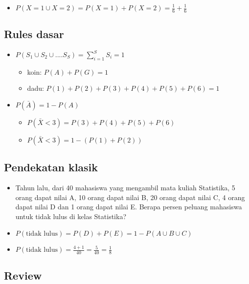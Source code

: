 \documentclass[
  letterpaper,
  DIV=11,
  numbers=noendperiod]{scrartcl}
\providecommand{\tightlist}{%
  \setlength{\itemsep}{0pt}\setlength{\parskip}{0pt}}\usepackage{longtable,booktabs,array}
\begin{document}
\begin{itemize}
\tightlist
\item
  \(P(X=1 \cup X=2)=P(X=1)+P(X=2)=\frac{1}{6}+\frac{1}{6}\)
\end{itemize}

\subsection{Rules dasar}\label{rules-dasar-1}

\begin{itemize}
\item
  \(P(S_1 \cup S_2 \cup .... S_S)=\sum_{i=1}^S S_i=1\)

  \begin{itemize}
  \item
    koin: \(P(A)+P(G)=1\)
  \item
    dadu: \(P(1)+P(2)+P(3)+P(4)+P(5)+P(6)=1\)
  \end{itemize}
\item
  \(P(\bar{A})=1-P(A)\)

  \begin{itemize}
  \item
    \(P(\bar{X}<3)=P(3)+P(4)+P(5)+P(6)\)
  \item
    \(P(\bar{X}<3)=1-\left(P(1)+P(2) \right)\)
  \end{itemize}
\end{itemize}

\subsection{Pendekatan klasik}\label{pendekatan-klasik}

\begin{itemize}
\item
  Tahun lalu, dari 40 mahasiswa yang mengambil mata kuliah Statistika, 5
  orang dapat nilai A, 10 orang dapat nilai B, 20 orang dapat nilai C, 4
  orang dapat nilai D dan 1 orang dapat nilai E. Berapa persen peluang
  mahasiswa untuk tidak lulus di kelas Statistika?
\item
  \(P(\text{tidak lulus})=P(D)+P(E)=1-P(A \cup B \cup C)\)
\item
  \(P(\text{tidak lulus})=\frac{4+1}{40}=\frac{5}{40}=\frac{1}{8}\)
\end{itemize}

\subsection{Review}\label{review}
\end{document}
